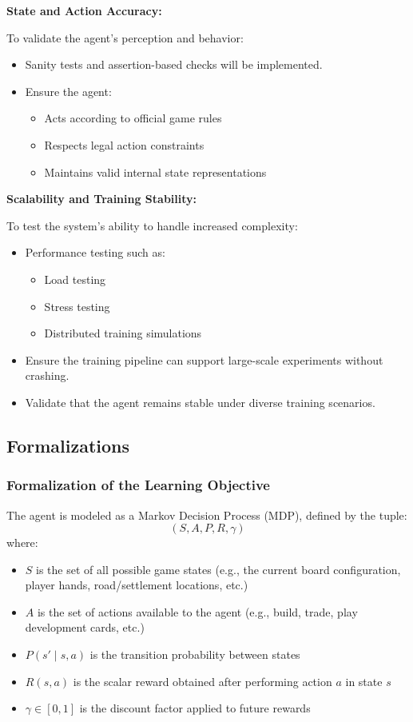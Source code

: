 \documentclass{article}
\begin{document}
\noindent\textbf{State and Action Accuracy:}

To validate the agent’s perception and behavior:
\begin{itemize}
    \item Sanity tests and assertion-based checks will be implemented.
    \item Ensure the agent:
    \begin{itemize}
        \item Acts according to official game rules
        \item Respects legal action constraints
        \item Maintains valid internal state representations
    \end{itemize}
\end{itemize}

\noindent\textbf{Scalability and Training Stability:}

To test the system’s ability to handle increased complexity:
\begin{itemize}
    \item Performance testing such as:
    \begin{itemize}
        \item Load testing
        \item Stress testing
        \item Distributed training simulations
    \end{itemize}
    \item Ensure the training pipeline can support large-scale experiments without crashing.
    \item Validate that the agent remains stable under diverse training scenarios.
\end{itemize}

\subsection{Formalizations}
\subsubsection{Formalization of the Learning Objective}
\label{sec:formalization}

The \RL{} agent is modeled as a Markov Decision Process (MDP), defined by the tuple:
\[
(S, A, P, R, \gamma)
\]
where:
\begin{itemize}
    \item $S$ is the set of all possible game states (e.g., the current board configuration, player hands, road/settlement locations, etc.)
    \item $A$ is the set of actions available to the agent (e.g., build, trade, play development cards, etc.)
    \item $P(s' \mid s, a)$ is the transition probability between states
    \item $R(s, a)$ is the scalar reward obtained after performing action $a$ in state $s$
    \item $\gamma \in [0, 1]$ is the discount factor applied to future rewards
\end{itemize}
\end{document}
